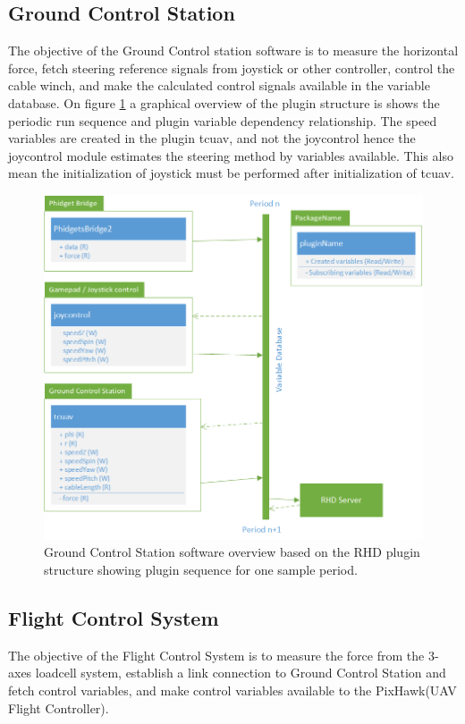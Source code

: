 \subsection{Ground Control Station}
The objective of the Ground Control station software is to measure the horizontal force, fetch steering reference signals from joystick or other controller, control the cable winch, and make the calculated control signals available in the variable database. On figure \ref{fig:GCS-software-overview} a graphical overview of the plugin structure is shows the periodic run sequence and plugin variable dependency relationship. The speed variables are created in the plugin tcuav, and not the joycontrol hence the joycontrol module estimates the steering method by variables available. This also mean the initialization of joystick must be performed after initialization of tcuav. 
\begin{figure}[hbtp]
\centering
\includegraphics[scale=0.8]{graphics/Visio/GCS-software-overview.png}
\caption[Ground Control Station software overview]{Ground Control Station software overview based on the RHD plugin structure showing plugin sequence for one sample period.}
\label{fig:GCS-software-overview}
\end{figure}




\subsection{Flight Control System}
The objective of the Flight Control System is to measure the force from the 3-axes loadcell system, establish a link connection to Ground Control Station and fetch control variables, and make control variables available to the PixHawk(UAV Flight Controller).


